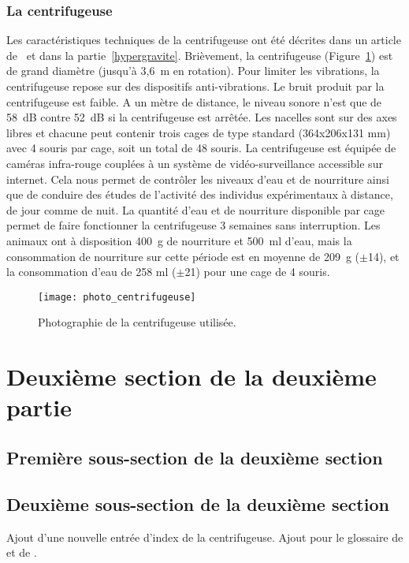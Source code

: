 \subsubsection{La centrifugeuse}
Les caractéristiques techniques de la centrifugeuse ont été décrites dans un article de~\cite{jamon_ground-based_2008} et dans la partie~\ref{hypergravite}. Brièvement, la centrifugeuse (Figure~\ref{photo_centrifugeuse}) est de grand diamètre (jusqu'à 3,6~m en rotation). Pour limiter les vibrations, la centrifugeuse repose sur des dispositifs anti-vibrations. Le bruit produit par la centrifugeuse est faible. A un mètre de distance, le niveau sonore n'est que de 58~dB contre 52~dB si la centrifugeuse est arrêtée. Les nacelles sont sur des axes libres et chacune peut contenir trois cages de type standard (364x206x131 mm) avec 4 souris par cage, soit un total de 48 souris. La centrifugeuse est équipée de caméras infra-rouge couplées à un système de vidéo-surveillance accessible sur internet. Cela nous permet de contrôler les niveaux d'eau et de nourriture ainsi que de conduire des études de l'activité des individus expérimentaux à distance, de jour comme de nuit. La quantité d'eau et de nourriture disponible par cage permet de faire fonctionner la centrifugeuse 3 semaines sans interruption. Les animaux ont à disposition 400~g de nourriture et 500~ml d'eau, mais la consommation de nourriture sur cette période est en moyenne de 209~g ($\pm$14), et la consommation d'eau de 258 ml ($\pm$21) pour une cage de 4 souris.
\begin{figure}[h!tbp]
\vspace{0.5cm}
\setcapindent{2em}
  \centering
  \texttt{[image: photo\_centrifugeuse]}
  \caption[Photographie de la centrifugeuse]{Photographie de la centrifugeuse utilisée.}
\label{photo_centrifugeuse}
\end{figure}
\lipsum[2]
\section{Deuxième section de la deuxième partie}
\lipsum[3]
\subsection{Première sous-section de la deuxième section}
\lipsum[4]
\subsection[Sous-sous section 2]{Deuxième sous-section de la deuxième section} %
Ajout d'une nouvelle entrée d'index de la centrifugeuse. Ajout pour le glossaire de  et de .
